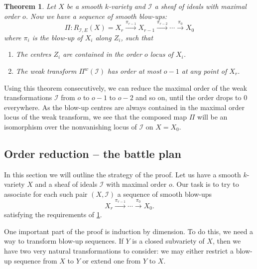 \documentclass[12pt,a4paper,leqno]{article}
\newcommand{\fref}[1]{\hyperref[{#1}]{\ref*{#1}}}
\theoremstyle{plain}
\newtheorem{thm}[theo]{Theorem}
\theoremstyle{definition}
\theoremstyle{remark}
\begin{document}
\begin{thm}\label{OrderReduction1}
Let $X$ be a smooth $k$-variety and $\mathscr{I}$ a sheaf of ideals with maximal order $o$. Now we have a sequence of smooth blow-ups:
\begin{equation*}
\Pi: R_{\mathscr{I},E} (X) = X_r \stackrel{\pi_{r-1}}{\to} X_{r-1} \stackrel{\pi_{r-2}}{\to} \cdots \stackrel{\pi_{0}}{\to} X_0
\end{equation*}
where $\pi_i$ is the blow-up of $X_i$ along $Z_i$, such that
\begin{enumerate}
\item The centres $Z_i$ are contained in the order $o$ locus of $X_i$.
\item The weak transform $\Pi^{w}(\mathscr{I})$ has order at most $o-1$ at any point of $X_r$.
\end{enumerate}
\end{thm}

Using this theorem consecutively, we can reduce the maximal order of the weak transformations  $\mathscr{I}$ from $o$ to $o-1$ to $o-2$ and so on, until the order drops to $0$ everywhere. As the blow-up centres are always contained in the maximal order locus of the weak transform, we see that the composed map $\Pi$ will be an isomorphism over the nonvanishing locus of $\mathscr{I}$ on $X=X_0$.

\subsection{Order reduction -- the battle plan}

In this section we will outline the strategy of the proof. Let us have a smooth $k$-variety $X$ and a sheaf of ideals $\mathscr{I}$ with maximal order $o$. Our task is to try to associate for each such pair $(X,\mathscr{I})$ a sequence of smooth blow-ups 
\begin{equation*}
X_r \stackrel{\pi_{r-1}}{\to} \cdots \stackrel{\pi_0}{\to} X_0.
\end{equation*}
satisfying the requirements of \fref{OrderReduction1}.

One important part of the proof is induction by dimension. To do this, we need a way to transform blow-up sequences. If $Y$ is a closed subvariety of $X$, then we have two very natural transformations to consider: we may either restrict a blow-up sequence from $X$ to $Y$ or extend one from $Y$ to $X$.
\end{document}
